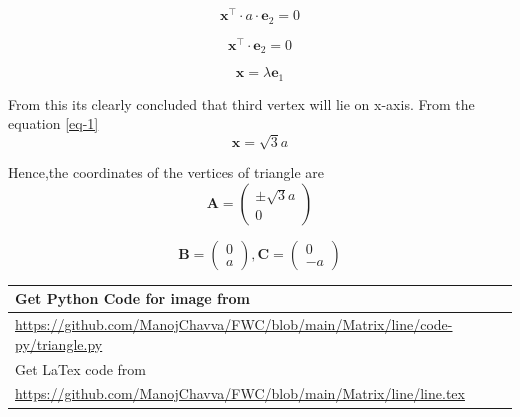 \documentclass[journal,12pt,twocolumn]{IEEEtran}
\let\vec\mathbf
\begin{document}
\begin{equation}
\vec{x}^\top \cdot a \cdot \vec{e}_2 = 0
\end{equation}

\begin{equation}
\vec{x}^\top \cdot \vec{e}_2 = 0
\end{equation}

\begin{equation}
\vec{x} = \lambda \vec{e}_1
\end{equation}

\noindent From this its clearly concluded that third vertex will lie on x-axis. 
\noindent From the equation \eqref{eq-1} 
\begin{equation}
\vec{x} = \sqrt{3}{a}
\end{equation}


\noindent Hence,the coordinates of the vertices of triangle are 
  \begin{equation*}
\vec{A} = 
   \begin{pmatrix}
   \pm\sqrt{3}a \\ 0
 \end{pmatrix}
 \end{equation*}

\begin{equation}
\vec{B}=\begin{pmatrix} 
0\\
a
\end{pmatrix}, {
\vec{C}=\begin{pmatrix} 
0\\
-a
\end{pmatrix} }
\end{equation}



\begin{table}[h]
\large
\begin{tabular}{lll}
\multicolumn{3}{l}{Get Python Code for image from}                                                 \\ \hline
\multicolumn{3}{|l|}{\url{https://github.com/ManojChavva/FWC/blob/main/Matrix/line/code-py/triangle.py}} \\ 
 \hline
\multicolumn{3}{l}{Get LaTex code from}                                                            \\ \hline
\multicolumn{3}{|l|}{\url{https://github.com/ManojChavva/FWC/blob/main/Matrix/line/line.tex}}            \\ \hline
\end{tabular}
\end{table}
\end{document}
